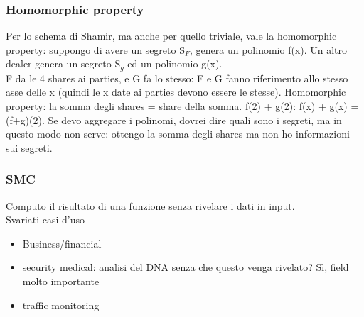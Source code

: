 \documentclass[16px]{article}
\begin{document}
\subsubsection{Homomorphic property}
Per lo schema di Shamir, ma anche per quello triviale, vale la homomorphic property: suppongo di avere un segreto S$_F$, genera un polinomio f(x). Un altro dealer genera un segreto S$_g$ ed un polinomio g(x).\\ F da le 4 shares ai parties, e G fa lo stesso: F e G fanno riferimento allo stesso asse delle x (quindi le x date ai parties devono essere le stesse). Homomorphic property: la somma degli shares = share della somma. f(2) + g(2): f(x) + g(x) = (f+g)(2). Se devo aggregare i polinomi, dovrei dire quali sono i segreti, ma in questo modo non serve: ottengo la somma degli shares ma non ho informazioni sui segreti.
\subsubsection{SMC}
Computo il risultato di una funzione senza rivelare i dati in input.\\ Svariati casi d'uso
\begin{itemize}
\item Business/financial
\item security medical: analisi del DNA senza che questo venga rivelato? Sì, field molto importante
\item traffic monitoring
\end{itemize}
\end{document}
